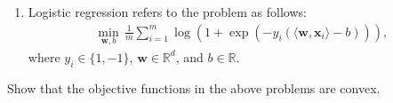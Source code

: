 \documentclass[11pt,letter,notitlepage]{article}
\theoremstyle{definition}
\begin{document}
\begin{exercise}
\begin{enumerate}
\begin{enumerate}
					\item Logistic regression refers to the problem as follows:
					\begin{align*}
						\min_{\mathbf{w},b}\,\frac{1}{m}\sum_{i=1}^m\log\left(1+\exp(-y_i(\langle \mathbf{w},\mathbf{x}_i\rangle-b))\right),
					\end{align*}
					where $y_i\in\{1,-1\}$, $\mathbf{w}\in\mathbb{R}^d$, and $b\in\mathbb{R}$.
				\end{enumerate}
				Show that the objective functions in the above problems are convex.
			\end{enumerate}
		\end{exercise}
		\begin{solution}
			
		\end{solution}
		
		
	
\end{document}
